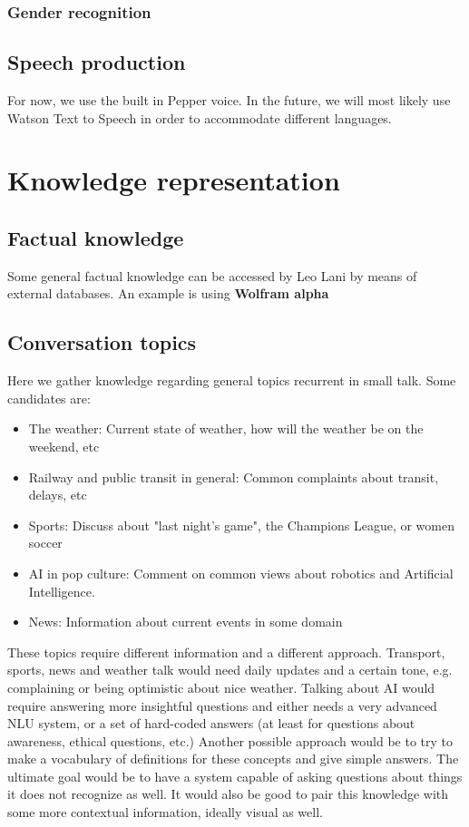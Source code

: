 \documentclass[a4paper]{article}
\begin{document}
\subsubsection{Gender recognition}

\subsection{Speech production}
For now, we use the built in Pepper voice. In the future, we will most likely use Watson Text to Speech in order to accommodate different languages.

\newpage
\section{Knowledge representation}

\subsection{Factual knowledge}
Some general factual knowledge can be accessed by Leo Lani by means of external databases. An example is using \textbf{Wolfram alpha}

\subsection{Conversation topics}
Here we gather knowledge regarding general topics recurrent in small talk. Some candidates are: 

\begin{itemize}
\item The weather: Current state of weather, how will the weather be on the weekend, etc
\item Railway and public transit in general: Common complaints about transit, delays, etc
\item Sports: Discuss about "last night's game", the Champions League, or women soccer
\item AI in pop culture: Comment on common views about robotics and Artificial Intelligence. 
\item News: Information about current events in some domain
\end{itemize}

These topics require different information and a different approach. Transport, sports, news and weather talk would need daily updates and a certain tone, e.g. complaining or being optimistic about nice weather. Talking about AI would require answering more insightful questions and either needs a very advanced NLU system, or a set of hard-coded answers (at least for questions about awareness, ethical questions, etc.) Another possible approach would be to try to make a vocabulary of definitions for these concepts and give simple answers. The ultimate goal would be to have a system capable of asking questions about things it does not recognize as well. It would also be good to pair this knowledge with some more contextual information, ideally visual as well. 
\end{document}

